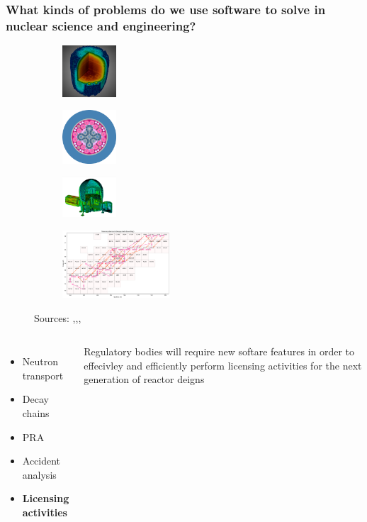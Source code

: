 \begin{frame}
    \frametitle{What kinds of problems do we use software to solve in nuclear science and engineering?}

    \begin{figure}[htpb]
        \begin{subfigure}
            \centering
            \includegraphics[width=2cm]{images/exasmr.png}
        \end{subfigure}
        \begin{subfigure}
           \centering
           \includegraphics[width=2cm]{images/atr.png} 
        \end{subfigure}
        \begin{subfigure}
           \centering
           \includegraphics[width=2cm]{images/hab1.png} 
        \end{subfigure}
        \begin{subfigure}
            \centering
            \includegraphics[width=4cm]{images/transmutation.png}
        \end{subfigure}
        {\tiny Sources: \cite{exasmr_fig},\cite{openmc_atr_slice},\cite{dagmc_nasa_module},\cite{armi_transmutation_fig}}
    \end{figure}
    \pause\medskip
    \begin{columns}
        \column[t]{5cm}
        \begin{itemize}
            \item Neutron transport
            \item Decay chains
            \item PRA
            \item Accident analysis
            \item {\bf Licensing activities}
        \end{itemize}

        \column[t]{5cm}
        Regulatory bodies will require new softare features in order to effecivley and efficiently perform licensing activities for the next generation of reactor deigns\cite{usnrc_nonlwr_2020-1}
    \end{columns}

\end{frame}

